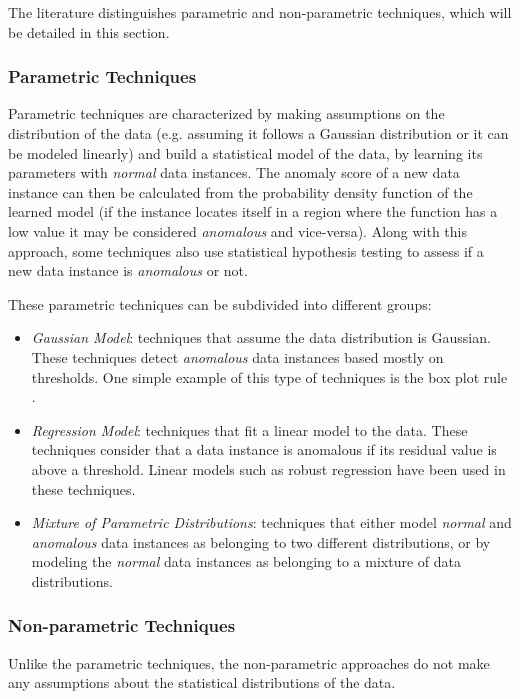 The literature distinguishes parametric and non-parametric techniques, which will be detailed in this section.

\subsubsection{Parametric Techniques}\mbox{}

Parametric techniques are characterized by making assumptions on the distribution of the data (e.g. assuming it follows a Gaussian distribution or it can be modeled linearly) and build a statistical model of the data, by learning its parameters with \textit{normal} data instances.
The anomaly score of a new data instance can then be calculated from the probability density function of the learned model (if the instance locates itself in a region where the function has a low value it may be considered \textit{anomalous} and vice-versa).
Along with this approach, some techniques also use statistical hypothesis testing to assess if a new data instance is \textit{anomalous} or not.

These parametric techniques can be subdivided into different groups:

\begin{itemize}
	\item \textit{Gaussian Model}: techniques that assume the data distribution is Gaussian. These techniques detect \textit{anomalous} data instances based mostly on thresholds. One simple example of this type of techniques is the box plot rule  \cite{laurikkala2000informal}.
	\item \textit{Regression Model}: techniques that fit a linear model to the data. These techniques consider that a data instance is anomalous if its residual value is above a threshold. Linear models such as robust regression \cite{leroy1987robust} have been used in these techniques.
	\item \textit{Mixture of Parametric Distributions}: techniques that either model \textit{normal} and \textit{anomalous} data instances as belonging to two different distributions, or by modeling the \textit{normal} data instances as belonging to a mixture of data distributions.
\end{itemize}

\subsubsection{Non-parametric Techniques}\mbox{}

Unlike the parametric techniques, the non-parametric approaches do not make any assumptions about the statistical distributions of the data.

